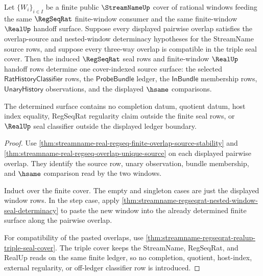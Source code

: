

\begin{theorem}
\label{thm:streamname-regseqrat-finite-window-cover-determinacy}
Let $\{W_i\}_{i\in I}$ be a finite public $\StreamNameUp$ cover of rational
windows feeding the same $\RegSeqRat$ finite-window consumer and the same
finite-window $\RealUp$ handoff surface. Suppose every displayed pairwise
overlap satisfies the overlap-source and nested-window determinacy hypotheses
for the StreamName source rows, and suppose every three-way overlap is
compatible in the triple seal cover. Then the induced $\RegSeqRat$ seal rows
and finite-window $\RealUp$ handoff rows determine one cover-indexed source
surface: the selected $\mathsf{RatHistoryClassifier}$ rows, the
$\mathsf{ProbeBundle}$ ledger, the $\mathsf{InBundle}$ membership rows,
$\mathsf{UnaryHistory}$ observations, and the displayed $\hsame$ comparisons.

The determined surface contains no completion datum, quotient datum, host
index equality, RegSeqRat regularity claim outside the finite seal rows, or
$\RealUp$ seal classifier outside the displayed ledger boundary.
\end{theorem}
\begin{proof}
Use \autoref{thm:streamname-real-regseq-finite-overlap-source-stability} and
\autoref{thm:streamname-real-regseq-overlap-unique-source} on each displayed
pairwise overlap. They identify the source row, unary observation, bundle
membership, and $\hsame$ comparison read by the two windows.

Induct over the finite cover. The empty and singleton cases are just the
displayed window rows. In the step case, apply
\autoref{thm:streamname-regseqrat-nested-window-seal-determinacy} to paste the
new window into the already determined finite surface along the pairwise
overlap.

For compatibility of the pasted overlaps, use
\autoref{thm:streamname-regseqrat-realup-triple-seal-cover}. The triple cover
keeps the StreamName, RegSeqRat, and RealUp reads on the same finite ledger, so
no completion, quotient, host-index, external regularity, or off-ledger
classifier row is introduced.
\end{proof}

